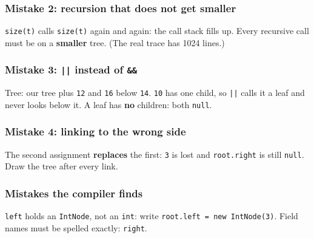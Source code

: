 \documentclass[aspectratio=169,10pt,compress]{beamer}
\begin{document}
\begin{frame}[t,fragile] \frametitle{Mistake 2: recursion that does not get smaller}

  \vspace{0.2em}
  \small \texttt{size(t)} calls \texttt{size(t)} again and again: the call stack fills up. Every recursive call must be on a \textbf{smaller} tree. (The real trace has 1024 lines.)
\end{frame}




\begin{frame}[t,fragile] \frametitle{Mistake 3: \texttt{||} instead of \texttt{\&\&}}

  \vspace{0.2em}
  \small Tree: our tree plus \texttt{12} and \texttt{16} below \texttt{14}. \texttt{10} has one child, so \texttt{||} calls it a leaf and never looks below it. A leaf has \textbf{no} children: both \texttt{null}.
\end{frame}




\begin{frame}[t,fragile] \frametitle{Mistake 4: linking to the wrong side}

  \vspace{0.2em}
  \small The second assignment \textbf{replaces} the first: \texttt{3} is lost and \texttt{root.right} is still \texttt{null}. Draw the tree after every link.
\end{frame}




\begin{frame}[t,fragile] \frametitle{Mistakes the compiler finds}

  \vspace{0.1em}
  \small
  \texttt{left} holds an \texttt{IntNode}, not an \texttt{int}: write \texttt{root.left = new IntNode(3)}. Field names must be spelled exactly: \texttt{right}.
\end{frame}
\end{document}
